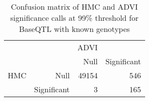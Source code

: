 \begin{table}[ht]
\centering
\begin{tabular}{rr|rr}
   &  & ADVI &  \\ 
    &   & Null & Significant \\ 
   \hline
HMC & Null & 49154 & 546 \\ 
    & Significant & 3 & 165 \\ 
  \end{tabular}
\caption{Confusion matrix of HMC and ADVI significance calls at 99\% threshold for BaseQTL with known genotypes} 
\label{tab:gt-xtab-99}
\end{table}
